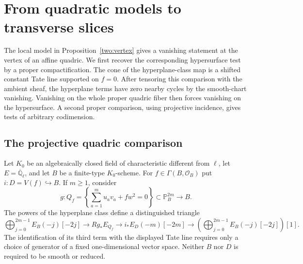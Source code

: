\section{From quadratic models to transverse slices}\label{sec:slices}

The local model in Proposition~\ref{two:vertex} gives a vanishing statement
at the vertex of an affine quadric.  We first recover the corresponding
hypersurface test by a proper compactification.  The cone of the
hyperplane-class map is a shifted constant Tate line supported on $f=0$.
After tensoring this comparison with the ambient sheaf, the hyperplane
terms have zero nearby cycles by the smooth-chart vanishing.  Vanishing
on the whole proper quadric fiber then forces vanishing on the
hypersurface.  A second proper comparison, using projective incidence,
gives tests of arbitrary codimension.

\subsection{The projective quadric comparison}

\begin{lemma}\label{slice:quadric}
Let $K_0$ be an algebraically closed field of characteristic different
from $\ell$, let $E=\overline{\mathbb Q}_{\ell}$, and let $B$ be a
finite-type $K_0$-scheme.  For $f\in\Gamma(B,\mathcal O_B)$ put
$i:D=V(f)\hookrightarrow B$.  If $m\geq1$, consider
\[
 g:Q_f=\left\{\sum_{a=1}^{m}u_av_a+fw^2=0\right\}
       \subset\mathbb P_B^{2m}\longrightarrow B.
\]
The powers of the hyperplane class define a distinguished triangle
\begin{equation}\label{eq:slice-quadric-triangle}
 \bigoplus_{j=0}^{2m-1}E_B(-j)[-2j]
 \longrightarrow Rg_*E_{Q_f}
 \longrightarrow i_*E_D(-m)[-2m]
 \longrightarrow
 \left(\bigoplus_{j=0}^{2m-1}E_B(-j)[-2j]\right)[1].
\end{equation}
The identification of its third term with the displayed Tate line
requires only a choice of generator of a fixed one-dimensional vector
space.  Neither $B$ nor $D$ is required to be smooth or reduced.
\end{lemma}

